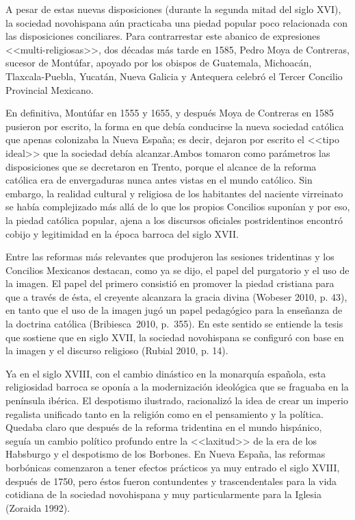 A pesar de estas nuevas disposiciones (durante la segunda mitad del siglo XVI),
la sociedad novohispana aún practicaba una piedad popular poco relacionada con
las disposiciones conciliares. Para contrarrestar este abanico de expresiones
<<multi-religiosas>>, dos décadas más tarde en 1585, Pedro Moya de Contreras,
sucesor de Montúfar,  apoyado por los obispos de Guatemala, Michoacán,
Tlaxcala-Puebla, Yucatán, Nueva Galicia y Antequera celebró el Tercer Concilio
Provincial Mexicano.

En definitiva, Montúfar en 1555 y 1655, y después Moya de Contreras en 1585
pusieron por escrito, la forma en que debía conducirse la nueva sociedad
católica que apenas colonizaba la Nueva España; es decir, dejaron por escrito
el <<tipo ideal>> que la sociedad debía alcanzar.\linebreak Ambos tomaron como parámetros
las disposiciones que se decretaron en Trento, porque el alcance de la reforma
católica era de envergaduras nunca antes vistas en el mundo católico. Sin
embargo, la realidad cultural y religiosa de los habitantes del naciente
virreinato se había complejizado más allá de lo que los propios Concilios
suponían y por eso, la piedad católica popular, ajena a los discursos oficiales
postridentinos encontró cobijo y legitimidad en la época barroca del siglo
XVII.

\enlargethispage{1\baselineskip}
Entre las reformas más relevantes que produjeron las sesiones tridentinas y los
Concilios Mexicanos destacan, como ya se dijo, el papel del purgatorio y el uso
de la imagen. El papel del primero consistió en promover la piedad cristiana
para que a través de ésta, el creyente alcanzara la gracia divina (Wobeser
2010, p. 43), en tanto que el uso de la imagen jugó un papel pedagógico para la
enseñanza de la doctrina católica (Bribiesca~2010, p.~355). En este sentido se
entiende la tesis que sostiene que en siglo XVII, la sociedad novohispana se
configuró con base en la imagen y el discurso religioso (Rubial 2010, p. 14).

Ya en el siglo XVIII, con el cambio dinástico en la monarquía española, esta
religiosidad barroca se oponía a la modernización ideológica que se fraguaba en
la península ibérica. El despotismo ilustrado, racionalizó la idea de crear un
imperio regalista unificado tanto en la religión como en el pensamiento y la
política. Quedaba claro que después de la reforma tridentina en el mundo
hispánico, seguía un cambio político profundo entre la <<laxitud>> de la era  de
los Habsburgo y el despotismo de los Borbones. En Nueva España, las reformas
borbónicas comenzaron a tener efectos prácticos ya muy entrado el siglo XVIII,
después de 1750, pero éstos fueron contundentes y trascendentales para la vida
cotidiana de la sociedad novohispana y muy particularmente para la Iglesia
(Zoraida 1992). 


